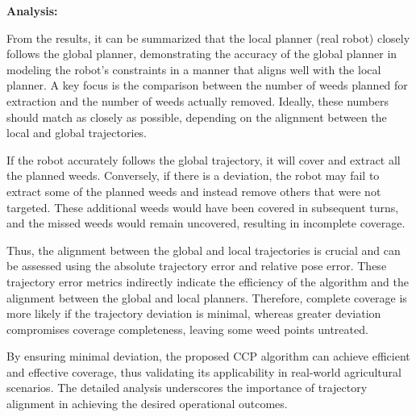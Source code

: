 

\vspace*{6mm}    


\textbf{Analysis: } 

From the results, it can be summarized that the local planner (real robot) closely follows the global planner, demonstrating the accuracy of the global planner in modeling the robot's constraints in a manner that aligns well with the local planner. A key focus is the comparison between the number of weeds planned for extraction and the number of weeds actually removed. Ideally, these numbers should match as closely as possible, depending on the alignment between the local and global trajectories.

\vspace*{6mm}   

If the robot accurately follows the global trajectory, it will cover and extract all the planned weeds. Conversely, if there is a deviation, the robot may fail to extract some of the planned weeds and instead remove others that were not targeted. These additional weeds would have been covered in subsequent turns, and the missed weeds would remain uncovered, resulting in incomplete coverage.

\vspace*{6mm}   

Thus, the alignment between the global and local trajectories is crucial and can be assessed using the absolute trajectory error and relative pose error. These trajectory error metrics indirectly indicate the efficiency of the algorithm and the alignment between the global and local planners. Therefore, complete coverage is more likely if the trajectory deviation is minimal, whereas greater deviation compromises coverage completeness, leaving some weed points untreated.

\vspace*{6mm}   

By ensuring minimal deviation, the proposed CCP algorithm can achieve efficient and effective coverage, thus validating its applicability in real-world agricultural scenarios. The detailed analysis underscores the importance of trajectory alignment in achieving the desired operational outcomes.

\vspace*{6mm}   
